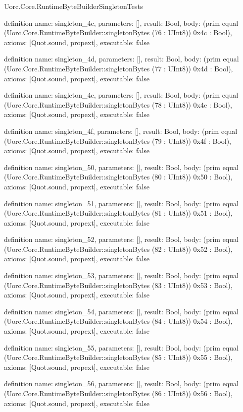 \begin{lexlean}{Uorc.Core.RuntimeByteBuilderSingletonTests}
\begin{semanticmodule}
definition{
  name: singleton_4c,
  parameters: [],
  result: Bool,
  body: (prim equal (Uorc.Core.RuntimeByteBuilder::singletonBytes (76 : UInt8)) 0x4c : Bool),
  axioms: [Quot.sound, propext],
  executable: false
}

definition{
  name: singleton_4d,
  parameters: [],
  result: Bool,
  body: (prim equal (Uorc.Core.RuntimeByteBuilder::singletonBytes (77 : UInt8)) 0x4d : Bool),
  axioms: [Quot.sound, propext],
  executable: false
}

definition{
  name: singleton_4e,
  parameters: [],
  result: Bool,
  body: (prim equal (Uorc.Core.RuntimeByteBuilder::singletonBytes (78 : UInt8)) 0x4e : Bool),
  axioms: [Quot.sound, propext],
  executable: false
}

definition{
  name: singleton_4f,
  parameters: [],
  result: Bool,
  body: (prim equal (Uorc.Core.RuntimeByteBuilder::singletonBytes (79 : UInt8)) 0x4f : Bool),
  axioms: [Quot.sound, propext],
  executable: false
}

definition{
  name: singleton_50,
  parameters: [],
  result: Bool,
  body: (prim equal (Uorc.Core.RuntimeByteBuilder::singletonBytes (80 : UInt8)) 0x50 : Bool),
  axioms: [Quot.sound, propext],
  executable: false
}

definition{
  name: singleton_51,
  parameters: [],
  result: Bool,
  body: (prim equal (Uorc.Core.RuntimeByteBuilder::singletonBytes (81 : UInt8)) 0x51 : Bool),
  axioms: [Quot.sound, propext],
  executable: false
}

definition{
  name: singleton_52,
  parameters: [],
  result: Bool,
  body: (prim equal (Uorc.Core.RuntimeByteBuilder::singletonBytes (82 : UInt8)) 0x52 : Bool),
  axioms: [Quot.sound, propext],
  executable: false
}

definition{
  name: singleton_53,
  parameters: [],
  result: Bool,
  body: (prim equal (Uorc.Core.RuntimeByteBuilder::singletonBytes (83 : UInt8)) 0x53 : Bool),
  axioms: [Quot.sound, propext],
  executable: false
}

definition{
  name: singleton_54,
  parameters: [],
  result: Bool,
  body: (prim equal (Uorc.Core.RuntimeByteBuilder::singletonBytes (84 : UInt8)) 0x54 : Bool),
  axioms: [Quot.sound, propext],
  executable: false
}

definition{
  name: singleton_55,
  parameters: [],
  result: Bool,
  body: (prim equal (Uorc.Core.RuntimeByteBuilder::singletonBytes (85 : UInt8)) 0x55 : Bool),
  axioms: [Quot.sound, propext],
  executable: false
}

definition{
  name: singleton_56,
  parameters: [],
  result: Bool,
  body: (prim equal (Uorc.Core.RuntimeByteBuilder::singletonBytes (86 : UInt8)) 0x56 : Bool),
  axioms: [Quot.sound, propext],
  executable: false
}


\end{semanticmodule}
\end{lexlean}
